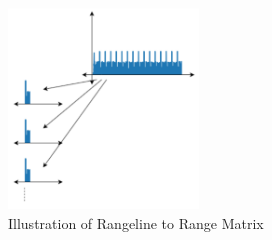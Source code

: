 \begin{figure}[h!]
    \centering
    \includegraphics[width = 0.45\textwidth]{images/rangeline2Matrix.pdf}
    \caption{Illustration of Rangeline to Range Matrix}\label{fig:rangeline2Matrix}
\end{figure}

\newpage
